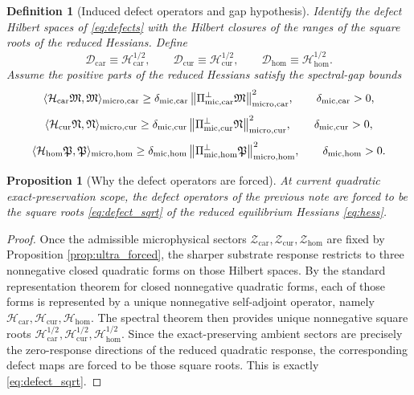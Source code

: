 \documentclass[11pt]{article}
\newcommand{\UltraTensorClass}{\mathscr Z_{\mathrm{car}}}
\newcommand{\UltraRelabelClass}{\mathscr Z_{\mathrm{cur}}}
\newcommand{\UltraFreeClass}{\mathscr Z_{\mathrm{hom}}}
\newcommand{\UltraTensor}{\mathfrak M}
\newcommand{\UltraRelabel}{\mathfrak N}
\newcommand{\UltraFree}{\mathfrak P}
\newcommand{\UltraCarPerp}{\Pi_{\mathrm{mic,car}}^{\perp}}
\newcommand{\UltraCurPerp}{\Pi_{\mathrm{mic,cur}}^{\perp}}
\newcommand{\UltraHomPerp}{\Pi_{\mathrm{mic,hom}}^{\perp}}
\newcommand{\UltraCarGap}{\delta_{\mathrm{mic,car}}}
\newcommand{\UltraCurGap}{\delta_{\mathrm{mic,cur}}}
\newcommand{\UltraHomGap}{\delta_{\mathrm{mic,hom}}}
\newcommand{\TensorDefect}{\mathcal D_{\mathrm{car}}}
\newcommand{\CurDefect}{\mathcal D_{\mathrm{cur}}}
\newcommand{\HomDefect}{\mathcal D_{\mathrm{hom}}}
\newcommand{\TensorHess}{\mathcal H_{\mathrm{car}}}
\newcommand{\CurHess}{\mathcal H_{\mathrm{cur}}}
\newcommand{\HomHess}{\mathcal H_{\mathrm{hom}}}
\newtheorem{definition}{Definition}
\newtheorem{proposition}{Proposition}
\begin{document}
\begin{definition}[Induced defect operators and gap hypothesis]
\label{def:induced_defects}
Identify the defect Hilbert spaces of \eqref{eq:defects} with the Hilbert closures of the ranges of the square roots of the reduced Hessians. Define
\begin{equation}
\TensorDefect\equiv \TensorHess^{1/2},
\qquad
\CurDefect\equiv \CurHess^{1/2},
\qquad
\HomDefect\equiv \HomHess^{1/2}.
\label{eq:defect_sqrt}
\end{equation}
Assume the positive parts of the reduced Hessians satisfy the spectral-gap bounds
\begin{equation}
\langle \TensorHess\UltraTensor,\UltraTensor\rangle_{\mathrm{micro,car}}
\ge
\UltraCarGap\,\norm{\UltraCarPerp\UltraTensor}_{\mathrm{micro,car}}^2,
\qquad
\UltraCarGap>0,
\label{eq:hgap_car}
\end{equation}
\begin{equation}
\langle \CurHess\UltraRelabel,\UltraRelabel\rangle_{\mathrm{micro,cur}}
\ge
\UltraCurGap\,\norm{\UltraCurPerp\UltraRelabel}_{\mathrm{micro,cur}}^2,
\qquad
\UltraCurGap>0,
\label{eq:hgap_cur}
\end{equation}
\begin{equation}
\langle \HomHess\UltraFree,\UltraFree\rangle_{\mathrm{micro,hom}}
\ge
\UltraHomGap\,\norm{\UltraHomPerp\UltraFree}_{\mathrm{micro,hom}}^2,
\qquad
\UltraHomGap>0.
\label{eq:hgap_hom}
\end{equation}
\end{definition}

\begin{proposition}[Why the defect operators are forced]
\label{prop:defects_forced}
At current quadratic exact-preservation scope, the defect operators of the previous note are forced to be the square roots \eqref{eq:defect_sqrt} of the reduced equilibrium Hessians \eqref{eq:hess}.
\end{proposition}

\begin{proof}
Once the admissible microphysical sectors \(\UltraTensorClass,\UltraRelabelClass,\UltraFreeClass\) are fixed by Proposition \ref{prop:ultra_forced}, the sharper substrate response restricts to three nonnegative closed quadratic forms on those Hilbert spaces. By the standard representation theorem for closed nonnegative quadratic forms, each of those forms is represented by a unique nonnegative self-adjoint operator, namely \(\TensorHess,\CurHess,\HomHess\). The spectral theorem then provides unique nonnegative square roots \(\TensorHess^{1/2},\CurHess^{1/2},\HomHess^{1/2}\). Since the exact-preserving ambient sectors are precisely the zero-response directions of the reduced quadratic response, the corresponding defect maps are forced to be those square roots. This is exactly \eqref{eq:defect_sqrt}.
\end{proof}
\end{document}
